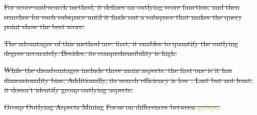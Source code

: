 \documentclass[
 size=14pt,
 paper=smartboard,  %
 mode=present, 		%
 display=slides, 	%
 style=tuliplab,  	%
 pauseslide,
 fleqn,leqno]{powerdot}
\providecommand{\DIFdeltex}[1]{{\protect\color{red}\sout{#1}}}                      %
\providecommand{\DIFdelbegin}{} %
\providecommand{\DIFdelend}{} %
\providecommand{\DIFdel}[1]{\texorpdfstring{\DIFdeltex{#1}}{}} %
\newcommand{\DIFscaledelfig}{0.5}
\newlength{\DIFdelgraphicswidth} %
\newlength{\DIFdelgraphicsheight} %
\newcommand{\DIFdelincludegraphics}[2][]{%
\sbox{\DIFdelgraphicsbox}{\DIFOincludegraphics[#1]{#2}}%
\settoboxwidth{\DIFdelgraphicswidth}{\DIFdelgraphicsbox} %
\settoboxtotalheight{\DIFdelgraphicsheight}{\DIFdelgraphicsbox} %
\scalebox{\DIFscaledelfig}{%
\parbox[b]{\DIFdelgraphicswidth}{\usebox{\DIFdelgraphicsbox}\\[-\baselineskip] \rule{\DIFdelgraphicswidth}{0em}}\llap{\resizebox{\DIFdelgraphicswidth}{\DIFdelgraphicsheight}{%
\setlength{\unitlength}{\DIFdelgraphicswidth}%
\begin{picture}(1,1)%
\thicklines\linethickness{2pt} %
{\color[rgb]{1,0,0}\put(0,0){\framebox(1,1){}}}%
{\color[rgb]{1,0,0}\put(0,0){\line( 1,1){1}}}%
{\color[rgb]{1,0,0}\put(0,1){\line(1,-1){1}}}%
\end{picture}%
}\hspace*{3pt}}} %
} %
\DeclareRobustCommand{\DIFdelbegin}{\DIFOdelbegin \let\includegraphics\DIFdelincludegraphics} %
\DeclareRobustCommand{\DIFdelend}{\DIFOaddend \let\includegraphics\DIFOincludegraphics} %
\begin{document}
\DIFdelend %
\DIFdelbegin %
\DIFdel{For score-and-search method,
it defines an outlying score function,
and then searches for each subspace until it finds out a subspace that
makes the query point show the best score. }%

\DIFdel{The advantages of this method are:
first, it enables to quantify the outlying degree accurately. Besides, its comprehensibility is high.
}\DIFdelend 


\DIFdelbegin \DIFdel{While the disadvantages include three main aspects:
the first one is it has dimensionality bias;
Additionally, its search efficiency is low .
Last but not least, it doesn't identify group outlying aspects.
}%
\DIFdelend %
\DIFdelbegin %

\DIFdelend %


\DIFdelbegin %
\DIFdel{Group Outlying Aspects Mining
}%
\DIFdel{Focus on differences between \textcolor{orange}{groups}.
}%
\end{document}
